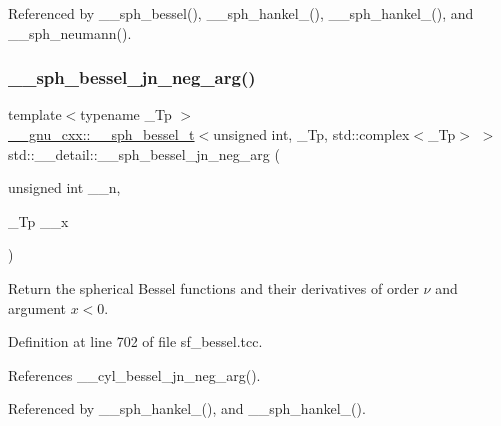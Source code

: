Referenced by \+\_\+\+\_\+sph\+\_\+bessel(), \+\_\+\+\_\+sph\+\_\+hankel\+\_(), \+\_\+\+\_\+sph\+\_\+hankel\+\_(), and \+\_\+\+\_\+sph\+\_\+neumann().

\mbox{\label{namespacestd_1_1____detail_a8c2a1782e4030a517568aaebecb09f9d}} 
\subsubsection{\texorpdfstring{\+\_\+\+\_\+sph\+\_\+bessel\+\_\+jn\+\_\+neg\+\_\+arg()}{\_\_sph\_bessel\_jn\_neg\_arg()}}
{\footnotesize\ttfamily template$<$typename \+\_\+\+Tp $>$ \\
\hyperlink{struct____gnu__cxx_1_1____sph__bessel__t}{\+\_\+\+\_\+gnu\+\_\+cxx\+::\+\_\+\+\_\+sph\+\_\+bessel\+\_\+t}$<$unsigned int, \+\_\+\+Tp, std\+::complex$<$\+\_\+\+Tp$>$ $>$ std\+::\+\_\+\+\_\+detail\+::\+\_\+\+\_\+sph\+\_\+bessel\+\_\+jn\+\_\+neg\+\_\+arg (\begin{DoxyParamCaption}\item[{unsigned int}]{\+\_\+\+\_\+n,  }\item[{\+\_\+\+Tp}]{\+\_\+\+\_\+x }\end{DoxyParamCaption})}

Return the spherical Bessel functions and their derivatives of order $ \nu $ and argument $ x < 0 $. 

Definition at line 702 of file sf\+\_\+bessel.\+tcc.



References \+\_\+\+\_\+cyl\+\_\+bessel\+\_\+jn\+\_\+neg\+\_\+arg().



Referenced by \+\_\+\+\_\+sph\+\_\+hankel\+\_(), and \+\_\+\+\_\+sph\+\_\+hankel\+\_().

\mbox{\label{namespacestd_1_1____detail_a1babbc6df4e260ad0e828044c9f33ca1}} 
